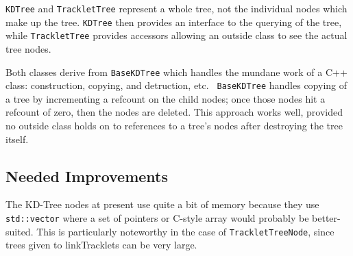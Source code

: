{\tt KDTree} and {\tt TrackletTree} represent a whole tree, not the
individual nodes which make up the tree.  {\tt KDTree} then provides
an interface to the querying of the tree, while {\tt TrackletTree}
provides accessors allowing an outside class to see the actual tree
nodes.  

Both classes derive from {\tt BaseKDTree} which handles the mundane
work of a C++ class: construction, copying, and detruction, etc. {\tt
BaseKDTree} handles copying of a tree by incrementing a refcount on
the child nodes; once those nodes hit a refcount of zero, then the
nodes are deleted.  This approach works well, provided no outside
class holds on to references to a tree's nodes after destroying the
tree itself.




\subsection{Needed Improvements}
The KD-Tree nodes at present use quite a bit of memory because they
use {\tt std::vector} where a set of pointers or C-style array would
probably be better-suited.  This is particularly noteworthy in the
case of {\tt TrackletTreeNode}, since trees given to linkTracklets can
be very large.



